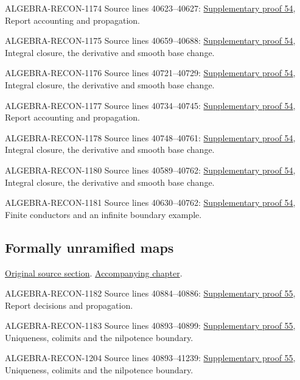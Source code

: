 \begin{AlgebraSourceRoutes}
\item[ALGEBRA-RECON-1174] Source lines 40623--40627: \hyperlink{algebra_local_integral_notes_20260928}{Supplementary proof 54}, Report accounting and propagation.
\item[ALGEBRA-RECON-1175] Source lines 40659--40688: \hyperlink{algebra_local_integral_notes_20260928}{Supplementary proof 54}, Integral closure, the derivative and smooth base change.
\item[ALGEBRA-RECON-1176] Source lines 40721--40729: \hyperlink{algebra_local_integral_notes_20260928}{Supplementary proof 54}, Integral closure, the derivative and smooth base change.
\item[ALGEBRA-RECON-1177] Source lines 40734--40745: \hyperlink{algebra_local_integral_notes_20260928}{Supplementary proof 54}, Report accounting and propagation.
\item[ALGEBRA-RECON-1178] Source lines 40748--40761: \hyperlink{algebra_local_integral_notes_20260928}{Supplementary proof 54}, Integral closure, the derivative and smooth base change.
\item[ALGEBRA-RECON-1180] Source lines 40589--40762: \hyperlink{algebra_local_integral_notes_20260928}{Supplementary proof 54}, Integral closure, the derivative and smooth base change.
\item[ALGEBRA-RECON-1181] Source lines 40630--40762: \hyperlink{algebra_local_integral_notes_20260928}{Supplementary proof 54}, Finite conductors and an infinite boundary example.
\end{AlgebraSourceRoutes}

\subsection{Formally unramified maps}
\hypertarget{algebra-source-section-formally-unramified}{}
\noindent\href{https://github.com/stacks/stacks-project/blob/a04446e57ec1fbc252a871afcec7752fb2807b14/algebra.tex\#L40769}{Original source section}. \href{algebra.pdf\#nameddest=section-formally-unramified}{Accompanying chapter}.

\begin{AlgebraSourceRoutes}
\item[ALGEBRA-RECON-1182] Source lines 40884--40886: \hyperlink{algebra_conormal_thickening_notes_20260928}{Supplementary proof 55}, Report decisions and propagation.
\item[ALGEBRA-RECON-1183] Source lines 40893--40899: \hyperlink{algebra_conormal_thickening_notes_20260928}{Supplementary proof 55}, Uniqueness, colimits and the nilpotence boundary.
\item[ALGEBRA-RECON-1204] Source lines 40893--41239: \hyperlink{algebra_conormal_thickening_notes_20260928}{Supplementary proof 55}, Uniqueness, colimits and the nilpotence boundary.
\end{AlgebraSourceRoutes}

